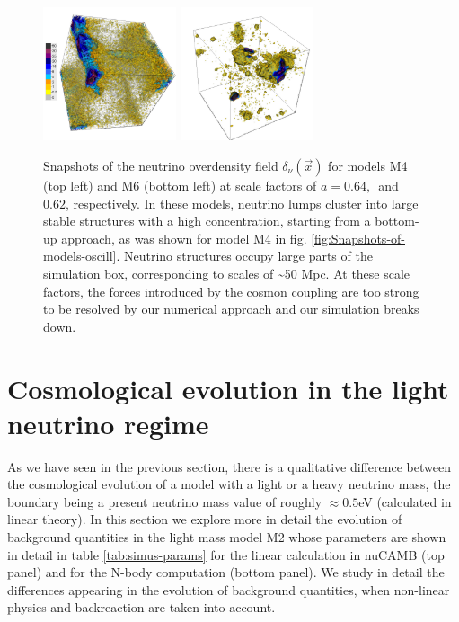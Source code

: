 \begin{figure}[htbp]
\begin{centering}
\includegraphics[width=0.35\textwidth]{Chapters/gnq/figures/model325-crash0062-1-leg}
\includegraphics[width=0.35\textwidth]{Chapters/gnq/figures/model5-crash065-1-noleg} 
\par\end{centering}
\caption[Snapshots of the neutrino
overdensity field for GNQ models M4
and M6.]{\label{fig:Snapshots-of-models-crashing}Snapshots of the neutrino
overdensity field $\delta_{\nu}(\vec{x})$ for models M4 (top left)
and M6 (bottom left) at scale factors of $a=0.64,\,$ and $0.62$,
respectively. In these models, neutrino lumps cluster into large stable
structures with a high concentration, starting from a bottom-up approach,
as was shown for model M4 in fig. \ref{fig:Snapshots-of-models-oscill}.
Neutrino structures occupy large parts of the simulation box, corresponding
to scales of \textasciitilde{}50 Mpc. At these scale factors, the
forces introduced by the cosmon coupling are too strong to be resolved
by our numerical approach and our simulation breaks down.}
\end{figure}



\section{Cosmological evolution in the light neutrino regime \label{sec:GNQ-cosmo}}

As we have seen in the previous section, there is a qualitative difference
between the cosmological evolution of a model with a light or a heavy
neutrino mass, the boundary being a present neutrino mass value of
roughly $\approx0.5$eV (calculated in linear theory). In this section
we explore more in detail the evolution of background quantities in
the light mass model M2 whose parameters are shown in detail in table
\ref{tab:simus-params} for the linear calculation in nuCAMB (top
panel) and for the N-body computation (bottom panel). We study in
detail the differences appearing in the evolution of background quantities,
when non-linear physics and backreaction are taken into account.

